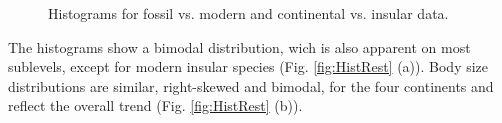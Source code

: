 \begin{center}
	\begin{figure}[htbp]
		\caption[Fossil vs. modern, continental vs. insular.]{Histograms for fossil vs. modern and continental vs. insular data.}
		\label{fig:HistFMCI}
	\end{figure}
\end{center}

The histograms show a bimodal distribution, wich is also apparent on most sublevels, except for modern insular species (Fig. \ref{fig:HistRest} (a)).
Body size distributions are similar, right-skewed and bimodal, for the four continents and reflect the overall trend (Fig. \ref{fig:HistRest} (b)).





